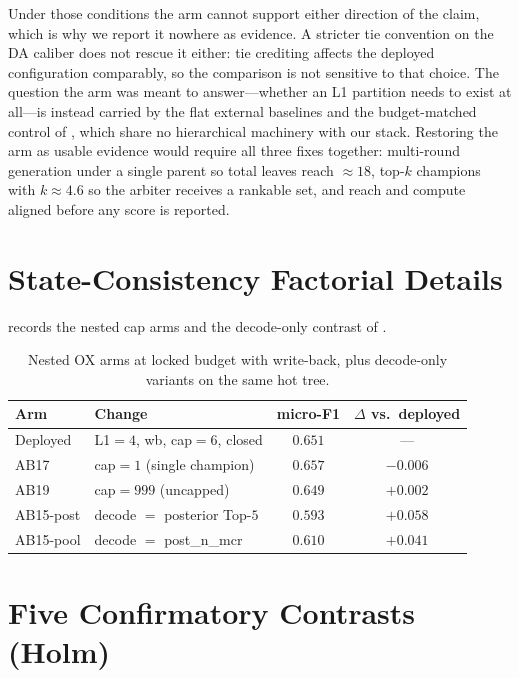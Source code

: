 Under those conditions the arm cannot support either direction of the claim, which is why we report it nowhere as evidence.
A stricter tie convention on the DA caliber does not rescue it either: tie crediting affects the deployed configuration comparably, so the comparison is not sensitive to that choice.
The question the arm was meant to answer---whether an L1 partition needs to exist at all---is instead carried by the flat external baselines and the budget-matched control of , which share no hierarchical machinery with our stack.
Restoring the arm as usable evidence would require all three fixes together: multi-round generation under a single parent so total leaves reach ${\approx}18$, top-$k$ champions with $k{\approx}4.6$ so the arbiter receives a rankable set, and reach and compute aligned before any score is reported.

\section{State-Consistency Factorial Details}
\label{app:state-fact}

 records the nested cap arms and the decode-only contrast of .

\begin{table}[t]
\centering
\small
\caption{Nested OX arms at locked budget with write-back, plus decode-only variants on the same hot tree.}
\label{tab:state-detail}
\begin{tabular}{llcc}
\toprule
Arm & Change & micro-F1 & $\Delta$ vs.\ deployed \\
\midrule
Deployed & L1${=}4$, wb, cap${=}6$, closed & $0.651$ & --- \\
AB17 & cap${=}1$ (single champion) & $0.657$ & $-0.006$ \\
AB19 & cap${=}999$ (uncapped) & $0.649$ & $+0.002$ \\
AB15-post & decode ${=}$ posterior Top-$5$ & $0.593$ & $+0.058$ \\
AB15-pool & decode ${=}$ post\_n\_mcr & $0.610$ & $+0.041$ \\
\bottomrule
\end{tabular}
\end{table}

\section{Five Confirmatory Contrasts (Holm)}
\label{app:holm}

